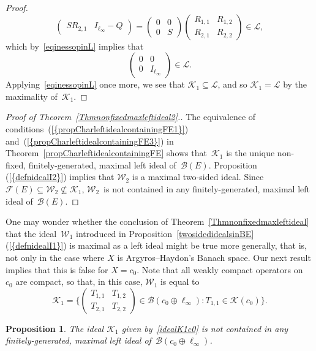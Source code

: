 \documentclass[12pt]{amsart}
\newtheorem{proposition}[theorem]{Proposition}
\theoremstyle{definition}
\numberwithin{equation}{section}
\begin{document}
\begin{proof}
\[\begin{pmatrix}
    SR_{2,1} & I_{\ell_\infty}-Q\end{pmatrix} = \begin{pmatrix} 0 &
    0\\ 0 & S\end{pmatrix}
  \begin{pmatrix} R_{1,1} & R_{1,2}\\ R_{2,1} &
    R_{2,2}\end{pmatrix}\in\mathscr{L},\] which
  by~\eqref{eqinessopinL} implies that \[
  \begin{pmatrix} 0 & 0\\ 0 &
    I_{\ell_\infty}\end{pmatrix}\in\mathscr{L}. \]
  Applying~\eqref{eqinessopinL} once more, we see that
  $\mathscr{K}_1\subseteq\mathscr{L}$, and so $\mathscr{K}_1 =
  \mathscr{L}$ by the maximality of~$\mathscr{K}_1$.
\end{proof}

\begin{proof}[Proof of Theorem~\ref{Thmnonfixedmaxleftideal2}.]
  The equivalence of
  conditions~{{\normalfont\textrm{(\ref{{propCharleftidealcontainingFE1}})}}}
  and~{{\normalfont\textrm{(\ref{{propCharleftidealcontainingFE3}})}}} in
  Theorem~\ref{propCharleftidealcontainingFE} shows
  that~$\mathscr{K}_1$ is the unique non-fixed, finitely-generated,
  maximal left ideal of~$\mathscr{B}(E)$.
  Proposition~{\normalfont{\ref{twosidedidealsinBE}}}  {{\normalfont\textrm{(\ref{{defnidealI2}})}}} implies that $\mathscr{W}_2$ is a maximal
  two-sided ideal. Since
  $\mathscr{F}(E)\subseteq\mathscr{W}_2\nsubseteq\mathscr{K}_1$,
  $\mathscr{W}_2$~is not contained in any finitely-generated, maximal
  left ideal of~$\mathscr{B}(E)$.
\end{proof}

One may wonder whether the conclusion of
Theorem~\ref{Thmnonfixedmaxleftideal} that the ideal~$\mathscr{W}_1$
introduced in
Proposition~\ref{twosidedidealsinBE}{{\normalfont\textrm{(\ref{{defnidealI1}})}}} is maximal
as a left ideal might be true more generally, that is, not only in the
case where $X$ is Argyros--Haydon's Banach space.  Our next result
implies that this is false for $X = c_0$. Note that all weakly compact
operators on~$c_0$ are compact, so that, in this case, $\mathscr{W}_1$
is equal to
\begin{equation}\label{idealK1c0}
  \mathscr{K}_1 = \biggl\{\begin{pmatrix} T_{1,1} & T_{1,2}\\
    T_{2,1} & 
    T_{2,2} \end{pmatrix}\in\mathscr{B}(c_0\oplus\ell_\infty) :
  T_{1,1}\in\mathscr{K}(c_0)\biggr\}.
\end{equation} 
\begin{proposition}\label{propK1notinfgmaxleftideal}
  The ideal $\mathscr{K}_1$ given by~\eqref{idealK1c0} is not
  contained in any finitely-generated, maximal left ideal
  of~$\mathscr{B}(c_0\oplus\ell_\infty)$.
\end{proposition}
\end{document}
